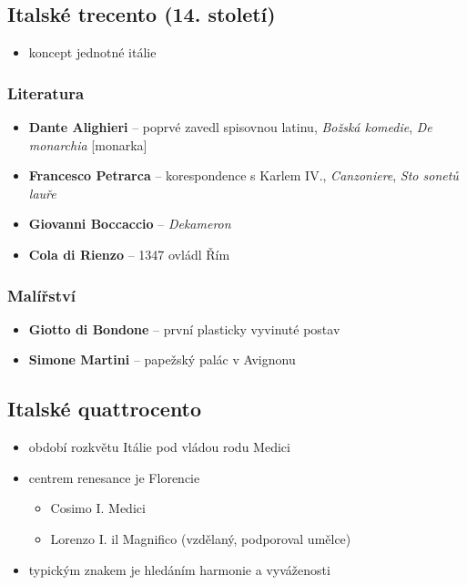 \subsection{Italské trecento (14. století)}
\begin{itemize}
\item koncept jednotné itálie
\end{itemize}

\subsubsection{Literatura}
\begin{itemize}
\item \textbf{Dante Alighieri} -- poprvé zavedl spisovnou latinu, \textit{Božská komedie}, \textit{De monarchia} [monarka]
\item \textbf{Francesco Petrarca} -- korespondence s Karlem IV., \textit{Canzoniere}, \textit{Sto sonetů lauře}
\item \textbf{Giovanni Boccaccio} -- \textit{Dekameron}
\item \textbf{Cola di Rienzo} -- 1347 ovládl Řím
\end{itemize}

\subsubsection{Malířství}
\begin{itemize}
\item \textbf{Giotto di Bondone} -- první plasticky vyvinuté postav
\item \textbf{Simone Martini} -- papežský palác v Avignonu
\end{itemize}


\subsection{Italské quattrocento}
\begin{itemize}
\item období rozkvětu Itálie pod vládou rodu Medici
\item centrem renesance je Florencie
	\begin{itemize}
	\item Cosimo I. Medici
	\item Lorenzo I. il Magnifico (vzdělaný, podporoval umělce)
	\end{itemize}
\item typickým znakem je hledáním harmonie a vyváženosti
\end{itemize}

